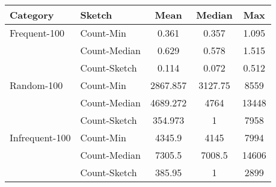 \begin{tabular}{llccc}
\toprule
Category & Sketch & Mean & Median & Max \\
\midrule
Frequent-100 & Count-Min & 0.361 & 0.357 & 1.095 \\
 & Count-Median & 0.629 & 0.578 & 1.515 \\
 & Count-Sketch & 0.114 & 0.072 & 0.512 \\
\midrule
Random-100 & Count-Min & 2867.857 & 3127.75 & 8559 \\
 & Count-Median & 4689.272 & 4764 & 13448 \\
 & Count-Sketch & 354.973 & 1 & 7958 \\
\midrule
Infrequent-100 & Count-Min & 4345.9 & 4145 & 7994 \\
 & Count-Median & 7305.5 & 7008.5 & 14606 \\
 & Count-Sketch & 385.95 & 1 & 2899 \\
\bottomrule
\end{tabular}
